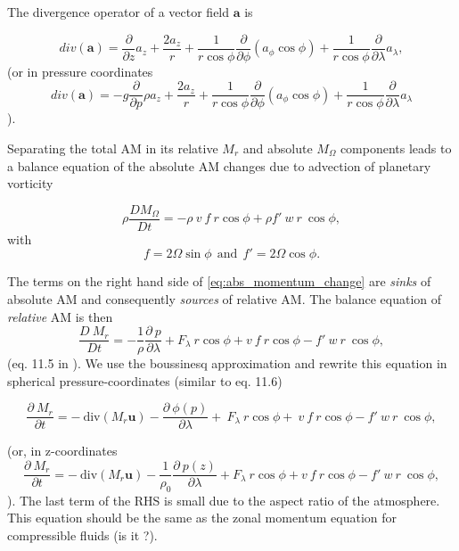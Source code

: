 \documentclass[11pt]{article}
\numberwithin{equation}{section}
\newcommand{\beq}{\begin{equation}}
\newcommand{\eeq}{\end{equation}}
\newcommand{\beqs}{\begin{equation*}}
\newcommand{\eeqs}{\end{equation*}}
\newcommand{\vect}[1]{\boldsymbol{#1}}
\newcommand{\Dt}[1]{\frac{D#1}{D t}}
\newcommand{\cphi}{\cos \phi}
\begin{document}
The divergence operator of a vector field $\vect a$ is 

\beq
div(\vect a ) = \frac{\partial}{\partial z} a_z + \frac{2 a_z}{r} + \frac{1}{r \cos{\phi}}  \frac{\partial}{\partial \phi} ( a_{\phi} \cos{\phi}) + \frac{1}{r \cos{\phi}} \frac{\partial}{\partial \lambda} a_\lambda, 
\eeq
(or in pressure coordinates
\beq
div(\vect a ) = - g \frac{\partial}{\partial p } \rho a_z + \frac{2 a_z}{r} + \frac{1}{r \cos{\phi}}  \frac{\partial}{\partial \phi} ( a_{\phi} \cos{\phi}) + \frac{1}{r \cos{\phi}} \frac{\partial}{\partial \lambda} a_\lambda
\eeq
).


Separating the total AM in its relative $M_r$ and absolute $M_\Omega$ components leads to a balance equation of the absolute AM changes due to advection of planetary vorticity

\beq \label{eq:abs_momentum_change}
\rho \Dt {M_\Omega} = - \rho ~ v ~ f ~r \cphi + \rho f' ~ w~ r ~ \cphi, 
\eeq
with  
\beqs
f  = 2 \Omega \sin \phi ~~\text{and}~~  f' = 2 \Omega \cphi.
\eeqs


The terms on the right hand side of \eqref{eq:abs_momentum_change} are {\it sinks} of absolute AM and consequently {\it sources} of relative AM. The balance equation of {\it relative} AM is then
\beq
\frac{D ~M_r}{D t}  = -   \frac{1}{\rho} \frac{\partial~p}{\partial \lambda} + F_\lambda~ r \cphi +  v ~ f ~r \cphi - f' ~ w~ r ~ \cphi, 
\eeq
(eq. 11.5 in \citet{Peixoto2008}). We use the boussinesq approximation and rewrite this equation in spherical pressure-coordinates (similar to \citet{Peixoto2008} eq. 11.6) 

\beq \label{eq:rel_momentum_conservation}
\frac{\partial ~ M_r}{\partial t}  = -~\text{div}(M_r \vect u) - \frac{\partial~\phi(p)}{\partial \lambda} + ~F_\lambda~ r \cphi +  ~ v ~ f ~r \cphi - f' ~ w~ r ~ \cphi, 
\eeq

(or, in z-coordinates
\beqs
\frac{\partial ~M_r}{\partial t}  = - ~\text{div}( M_r \vect u)-   \frac{1}{\rho_0} \frac{\partial~p(z)}{\partial \lambda} + F_\lambda~ r \cphi +  v ~ f ~r \cphi - f' ~ w~ r ~ \cphi,
\eeqs
).
The last term of the RHS is small due to the aspect ratio of the atmosphere. This equation should be the same as the zonal momentum equation for compressible fluids (is it ?).\par
\end{document}
